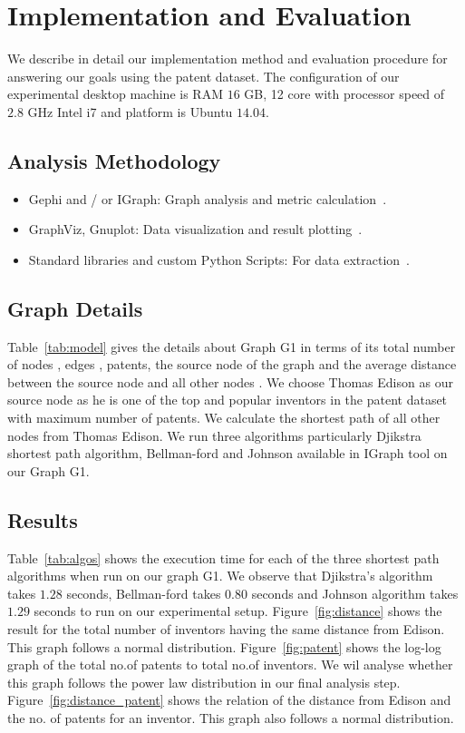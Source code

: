 \section{Implementation and Evaluation}
\label{sec:eval}
We describe in detail our implementation method and evaluation procedure for answering 
our goals using the patent dataset. The configuration of our experimental desktop machine is RAM $16$ GB, 12 core with processor speed of
 $2.8$ GHz Intel i7 and platform is Ubuntu $14.04$.

\subsection{Analysis Methodology}

\begin{itemize}
\squish
\item Gephi and / or IGraph: Graph analysis and metric calculation~\cite{gephi, igraph}.

\item GraphViz, Gnuplot: Data visualization and result plotting~\cite{graphviz, gnuplot}.

\item Standard libraries and custom Python Scripts: For data extraction~\cite{python}.
\end{itemize}

\subsection{Graph Details}
Table~\ref{tab:model} gives the details about Graph G1 in
terms of its total number of nodes , edges , patents, the source node  of the graph
and the average distance between the source node and all other nodes .  
 We choose Thomas Edison as our source node
as he is one of the top and popular inventors in the patent dataset with maximum number of patents.
We calculate the shortest path of all other nodes from Thomas Edison. 
We run three algorithms particularly Djikstra shortest path algorithm, Bellman-ford and Johnson 
available in IGraph tool on our Graph G1. 

\subsection{Results}
Table~\ref{tab:algos} shows the execution time for each of the three shortest path algorithms 
when run on our graph G1. We observe that Djikstra's algorithm takes $1.28$ seconds, Bellman-ford takes
$0.80$ seconds and Johnson algorithm takes $1.29$ seconds to run on our experimental setup.
Figure~\ref{fig:distance} shows the result for the total number of inventors having the same
distance from Edison. This graph follows a normal distribution. Figure~\ref{fig:patent} shows the log-log graph of the total no.of patents
to total no.of inventors. We wil analyse whether this graph follows the power law distribution in our 
final analysis step. Figure~\ref{fig:distance_patent} shows the relation of the distance from Edison and
the no. of patents for an inventor. This graph also follows a normal distribution.



